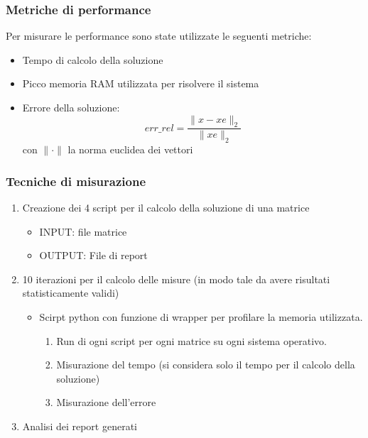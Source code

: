 \documentclass{beamer}
\begin{document}
\begin{frame}
	\frametitle{Metriche di performance}
	Per misurare le performance sono state utilizzate le seguenti metriche:
	\begin{itemize}
		\item Tempo di calcolo della soluzione
		\item Picco memoria RAM utilizzata per risolvere il sistema
		\item Errore della soluzione: \[err \_ rel = \frac{\|x - xe\|_2}{\|xe\|_2}\]
		con $\| \cdot \|$ la norma euclidea dei vettori
	\end{itemize}
	\end{frame}

\begin{frame}
	
	\frametitle{Tecniche di misurazione}
		\begin{enumerate}
		\item Creazione dei 4 script per il calcolo della soluzione di una matrice
		\begin{itemize}
			\item INPUT: file matrice
			\item OUTPUT: File di report
		\end{itemize}

		\item 10 iterazioni per il calcolo delle misure (in modo tale da avere risultati statisticamente validi)
	
		\begin{itemize}
			\item Scirpt python con funzione di wrapper per profilare la memoria utilizzata.
			\begin{enumerate}
				\item Run di ogni script per ogni matrice su ogni sistema operativo.

					\item Misurazione del tempo (si considera solo il tempo per il calcolo della soluzione)
					\item Misurazione dell'errore 

			\end{enumerate}
			
		\end{itemize}


		\item Analisi dei report generati				

	\end{enumerate}
\end{frame}
\end{document}
